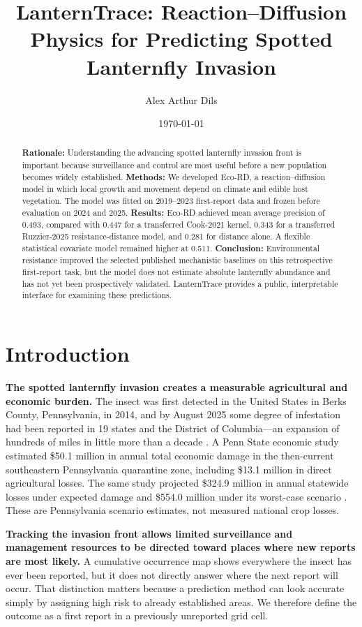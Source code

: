 \documentclass{article}
\title{LanternTrace: Reaction--Diffusion Physics for Predicting Spotted Lanternfly Invasion}
\author{Alex Arthur Dils}
\date{\today}
\begin{document}
\maketitle

\begin{abstract}
\textbf{Rationale:} Understanding the advancing spotted lanternfly invasion front is important because surveillance and control are most useful before a new population becomes widely established. \textbf{Methods:} We developed Eco-RD, a reaction--diffusion model in which local growth and movement depend on climate and edible host vegetation. The model was fitted on 2019--2023 first-report data and frozen before evaluation on 2024 and 2025. \textbf{Results:} Eco-RD achieved mean average precision of 0.493, compared with 0.447 for a transferred Cook-2021 kernel, 0.343 for a transferred Ruzzier-2025 resistance-distance model, and 0.281 for distance alone. A flexible statistical covariate model remained higher at 0.511. \textbf{Conclusion:} Environmental resistance improved the selected published mechanistic baselines on this retrospective first-report task, but the model does not estimate absolute lanternfly abundance and has not yet been prospectively validated. LanternTrace provides a public, interpretable interface for examining these predictions.
\end{abstract}

\section{Introduction}

\textbf{The spotted lanternfly invasion creates a measurable agricultural and economic burden.} The insect was first detected in the United States in Berks County, Pennsylvania, in 2014, and by August 2025 some degree of infestation had been reported in 19 states and the District of Columbia---an expansion of hundreds of miles in little more than a decade \cite{usda2025}. A Penn State economic study estimated \$50.1 million in annual total economic damage in the then-current southeastern Pennsylvania quarantine zone, including \$13.1 million in direct agricultural losses. The same study projected \$324.9 million in annual statewide losses under expected damage and \$554.0 million under its worst-case scenario \cite{harper2019}. These are Pennsylvania scenario estimates, not measured national crop losses.

\textbf{Tracking the invasion front allows limited surveillance and management resources to be directed toward places where new reports are most likely.} A cumulative occurrence map shows everywhere the insect has ever been reported, but it does not directly answer where the next report will occur. That distinction matters because a prediction method can look accurate simply by assigning high risk to already established areas. We therefore define the outcome as a first report in a previously unreported grid cell.
\end{document}
